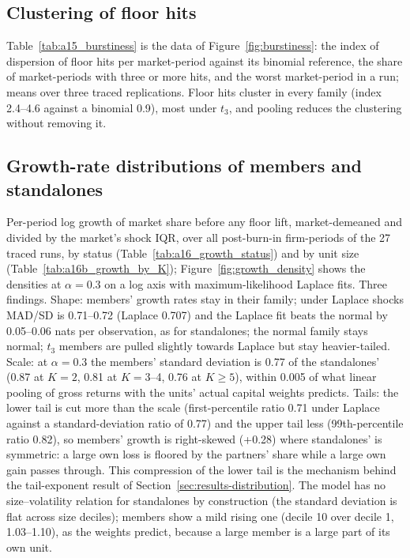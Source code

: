 

\subsection{Clustering of floor hits}\label{app:burstiness}

Table~\ref{tab:a15_burstiness} is the data of Figure~\ref{fig:burstiness}: the index of dispersion of floor hits per market-period against its binomial reference, the share of market-periods with three or more hits, and the worst market-period in a run; means over three traced replications. Floor hits cluster in every family (index 2.4--4.6 against a binomial 0.9), most under $t_3$, and pooling reduces the clustering without removing it.



\subsection{Growth-rate distributions of members and standalones}\label{app:growth}

Per-period log growth of market share before any floor lift, market-demeaned and divided by the market's shock IQR, over all post-burn-in firm-periods of the 27 traced runs, by status (Table~\ref{tab:a16_growth_status}) and by unit size (Table~\ref{tab:a16b_growth_by_K}); Figure~\ref{fig:growth_density} shows the densities at $\alpha = 0.3$ on a log axis with maximum-likelihood Laplace fits. Three findings. Shape: members' growth rates stay in their family; under Laplace shocks MAD/SD is 0.71--0.72 (Laplace 0.707) and the Laplace fit beats the normal by 0.05--0.06 nats per observation, as for standalones; the normal family stays normal; $t_3$ members are pulled slightly towards Laplace but stay heavier-tailed. Scale: at $\alpha = 0.3$ the members' standard deviation is 0.77 of the standalones' (0.87 at $K = 2$, 0.81 at $K = 3$--4, 0.76 at $K \geq 5$), within 0.005 of what linear pooling of gross returns with the units' actual capital weights predicts. Tails: the lower tail is cut more than the scale (first-percentile ratio 0.71 under Laplace against a standard-deviation ratio of 0.77) and the upper tail less (99th-percentile ratio 0.82), so members' growth is right-skewed (+0.28) where standalones' is symmetric: a large own loss is floored by the partners' share while a large own gain passes through. This compression of the lower tail is the mechanism behind the tail-exponent result of Section~\ref{sec:results-distribution}. The model has no size--volatility relation for standalones by construction (the standard deviation is flat across size deciles); members show a mild rising one (decile 10 over decile 1, 1.03--1.10), as the weights predict, because a large member is a large part of its own unit.

